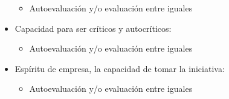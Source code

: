 \begin{itemize}
\begin{itemize}
	\item Autoevaluación y/o evaluación entre iguales \cite{Colomo-Palacios:2013}
	\end{itemize} 
\item Capacidad para ser críticos y autocríticos:
	\begin{itemize} 
	\item Autoevaluación y/o evaluación entre iguales \cite{Colomo-Palacios:2013}
	\end{itemize} 
\item Espíritu de empresa, la capacidad de tomar la iniciativa:
	\begin{itemize} 
	\item Autoevaluación y/o evaluación entre iguales \cite{Colomo-Palacios:2013}
	\end{itemize} 
\end{itemize}

